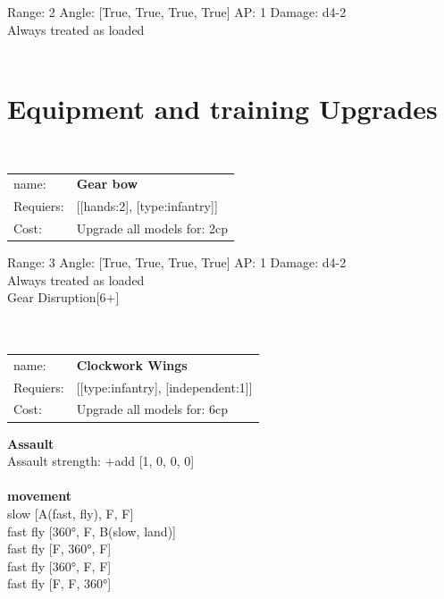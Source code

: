 Range: 2  Angle: [True, True, True, True] AP: 1 Damage: d4-2 \\
Always treated as loaded\\ 




 
\ \\

\section{Equipment and training Upgrades}\ \\
\begin{tabular}{ll}
name: & {\bf Gear bow } \\
Requiers: & [[hands:2], [type:infantry]] \\
Cost: & Upgrade all models for: 2cp \\
\end{tabular}



Range: 3  Angle: [True, True, True, True] AP: 1 Damage: d4-2 \\
Always treated as loaded\\ 
Gear Disruption[6+]\\ 








\ \\
\ \\
\begin{tabular}{ll}
name: & {\bf Clockwork Wings } \\
Requiers: & [[type:infantry], [independent:1]] \\
Cost: & Upgrade all models for: 6cp \\
\end{tabular}





{\bf Assault} \ \\
Assault strength: +add [1, 0, 0, 0] 
\\ 



\ \\ {\bf movement } \\
slow [A(fast, fly), F, F] \\
fast fly [360°, F, B(slow, land)] \\
fast fly [F, 360°, F] \\
fast fly [360°, F, F] \\
fast fly [F, F, 360°] \\

